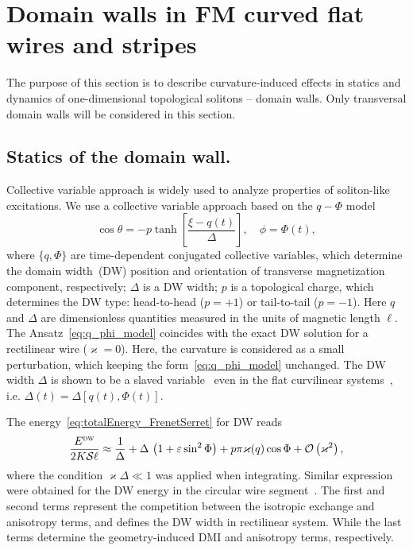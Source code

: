 \section{Domain walls in FM curved flat wires and stripes}\label{sec:DW_dyn}

The purpose of this section is to describe curvature-induced effects in statics and dynamics of one-dimensional topological solitons -- domain walls. Only transversal domain walls will be considered in this section.

\subsection{Statics of the domain wall.} Collective variable approach is widely used to analyze properties of soliton-like excitations. We use a collective variable approach based on the $q-\Phi$ model~\cite{Slonczewski72,Malozemoff79}
\begin{equation}\label{eq:q_phi_model}
\cos\theta=-p\tanh\left[\frac{\xi-q(t)}{\Delta}\right],\quad\phi=\Phi(t),
\end{equation}
where $\{q, \Phi\}$ are time-dependent conjugated collective variables, which determine the domain width~(DW) position and orientation of transverse magnetization component, respectively; $\Delta$ is a DW width; $p$ is a topological charge, which determines the DW type: head-to-head ($p = +1$) or tail-to-tail ($p = -1$). Here $q$ and $\Delta$ are dimensionless quantities measured in the units of magnetic length $\ell$. The Ansatz~\eqref{eq:q_phi_model} coincides with the exact DW solution for a rectilinear wire ($\varkappa=0$). Here, the curvature is considered as a small perturbation, which keeping the form~\eqref{eq:q_phi_model} unchanged. The DW width $\Delta$ is shown to be a slaved variable~\cite{Hillebrands06} even in the flat curvilinear systems~\cite{Yershov18a}, i.e. $\Delta(t) = \Delta\left[q(t),\Phi(t)\right]$.

The energy~\eqref{eq:totalEnergy_FrenetSerret} for DW reads
\begin{equation}\label{eq:dw_energy}
\frac{E^\textsc{dw}}{2K\mathcal{S}\ell}\approx\frac{1}{\Delta}+\Delta\,\left(1+\varepsilon\sin^2\Phi\right)+p\pi\varkappa(q)\cos\Phi+\mathcal{O}\left(\varkappa^2\right),
\end{equation}
where the condition $\varkappa\Delta\ll1$ was applied when integrating. Similar expression were obtained for the DW energy in the circular wire segment~\cite{Kruger07a}. The first and second terms represent the competition between the isotropic exchange and anisotropy terms, and defines the DW width in rectilinear system. While the last terms determine the geometry-induced DMI and anisotropy terms, respectively.

